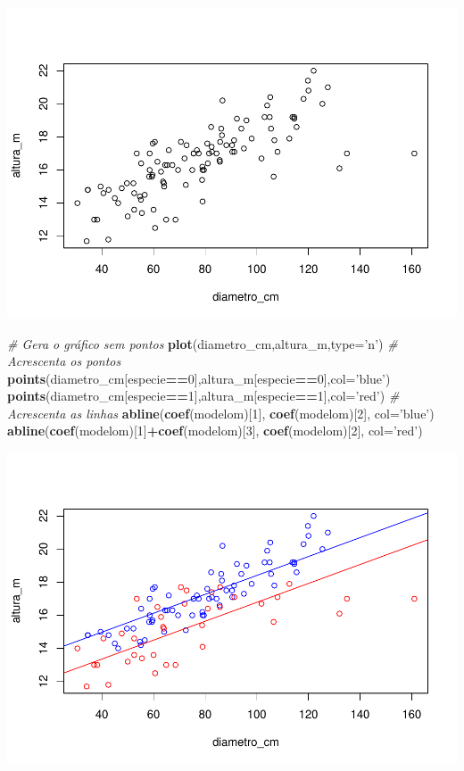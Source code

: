 \documentclass[12pt,brazil,]{book}
\newenvironment{Shaded}{\begin{snugshade}}{\end{snugshade}}
\newcommand{\CommentTok}[1]{\textcolor[rgb]{0.56,0.35,0.01}{\textit{#1}}}
\newcommand{\DataTypeTok}[1]{\textcolor[rgb]{0.13,0.29,0.53}{#1}}
\newcommand{\DecValTok}[1]{\textcolor[rgb]{0.00,0.00,0.81}{#1}}
\newcommand{\KeywordTok}[1]{\textcolor[rgb]{0.13,0.29,0.53}{\textbf{#1}}}
\newcommand{\NormalTok}[1]{#1}
\newcommand{\OperatorTok}[1]{\textcolor[rgb]{0.81,0.36,0.00}{\textbf{#1}}}
\newcommand{\StringTok}[1]{\textcolor[rgb]{0.31,0.60,0.02}{#1}}
\begin{document}
\includegraphics{04-RegMult_files/figure-latex/unnamed-chunk-4-1.pdf}

\begin{Shaded}
\begin{Highlighting}[]
\CommentTok{# Gera o gráfico sem pontos}
\KeywordTok{plot}\NormalTok{(diametro_cm,altura_m,}\DataTypeTok{type=}\StringTok{'n'}\NormalTok{) }
\CommentTok{# Acrescenta os pontos}
\KeywordTok{points}\NormalTok{(diametro_cm[especie}\OperatorTok{==}\DecValTok{0}\NormalTok{],altura_m[especie}\OperatorTok{==}\DecValTok{0}\NormalTok{],}\DataTypeTok{col=}\StringTok{'blue'}\NormalTok{)}
\KeywordTok{points}\NormalTok{(diametro_cm[especie}\OperatorTok{==}\DecValTok{1}\NormalTok{],altura_m[especie}\OperatorTok{==}\DecValTok{1}\NormalTok{],}\DataTypeTok{col=}\StringTok{'red'}\NormalTok{)}
\CommentTok{# Acrescenta as linhas}
\KeywordTok{abline}\NormalTok{(}\KeywordTok{coef}\NormalTok{(modelom)[}\DecValTok{1}\NormalTok{], }\KeywordTok{coef}\NormalTok{(modelom)[}\DecValTok{2}\NormalTok{], }\DataTypeTok{col=}\StringTok{'blue'}\NormalTok{)}
\KeywordTok{abline}\NormalTok{(}\KeywordTok{coef}\NormalTok{(modelom)[}\DecValTok{1}\NormalTok{]}\OperatorTok{+}\KeywordTok{coef}\NormalTok{(modelom)[}\DecValTok{3}\NormalTok{], }\KeywordTok{coef}\NormalTok{(modelom)[}\DecValTok{2}\NormalTok{], }\DataTypeTok{col=}\StringTok{'red'}\NormalTok{)}
\end{Highlighting}
\end{Shaded}

\includegraphics{04-RegMult_files/figure-latex/unnamed-chunk-4-2.pdf}
\end{document}

